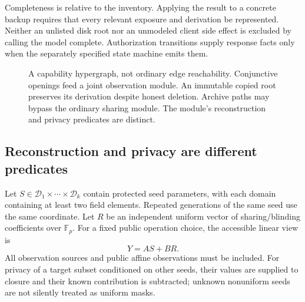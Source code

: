 \documentclass[pdflatex,sn-mathphys-num]{sn-jnl}
\theoremstyle{plain}
\theoremstyle{definition}
\newcommand{\F}{\mathbb{F}}
\begin{document}
Completeness is relative to the inventory. Applying the result to a concrete backup requires that every relevant exposure and derivation be represented. Neither an unlisted disk root nor an unmodeled client side effect is excluded by calling the model complete. Authorization transitions supply response facts only when the separately specified state machine emits them.

\begin{figure}[htbp]
\centering
{}
\caption{A capability hypergraph, not ordinary edge reachability. Conjunctive openings feed a joint observation module. An immutable copied root preserves its derivation despite honest deletion. Archive paths may bypass the ordinary sharing module. The module's reconstruction and privacy predicates are distinct.}\label{fig:capabilities}
\end{figure}

\subsection{Reconstruction and privacy are different predicates}
Let $S\in\mathcal D_1\times\cdots\times\mathcal D_k$ contain protected seed parameters, with each domain containing at least two field elements. Repeated generations of the same seed use the same coordinate. Let $R$ be an independent uniform vector of sharing/blinding coefficients over $\F_p$. For a fixed public operation choice, the accessible linear view is
\begin{equation}\label{eq:view}
 Y=A S+B R.
\end{equation}
All observation sources and public affine observations must be included. For privacy of a target subset conditioned on other seeds, their values are supplied to closure and their known contribution is subtracted; unknown nonuniform seeds are not silently treated as uniform masks.
\end{document}
